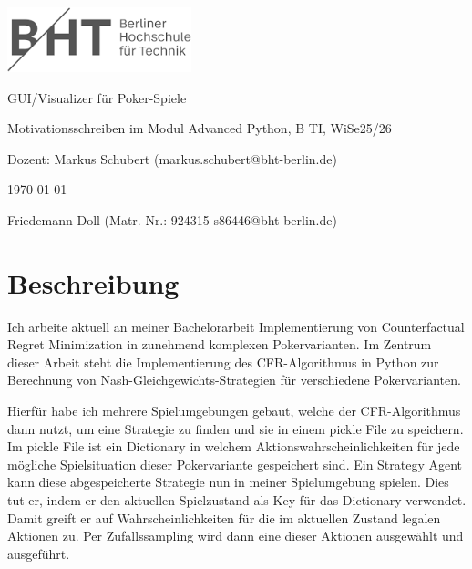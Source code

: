 \documentclass[12pt,german,english]{article}
\begin{document}
\begin{center}

    \includegraphics[width=0.4\textwidth]{bht-logo.png}

    \vspace{1.5cm}

    {\huge GUI/Visualizer für Poker-Spiele}

    \vspace*{1cm}

    Motivationsschreiben im Modul Advanced Python, B TI, WiSe25/26

    \vspace{0.5cm}

    Dozent: Markus Schubert (markus.schubert@bht-berlin.de)

    \vspace{0.5cm}

    \todayfmtde\today

    \vspace{1cm}

    Friedemann Doll (Matr.-Nr.: 924315 s86446@bht-berlin.de)

\end{center}

\vspace*{1cm}

\section{Beschreibung}
Ich arbeite aktuell an meiner Bachelorarbeit \glqq Implementierung von Counterfactual Regret Minimization in zunehmend komplexen Pokervarianten\grqq.
Im Zentrum dieser Arbeit steht die Implementierung des CFR-Algorithmus in Python zur Berechnung von Nash-Gleichgewichts-Strategien für verschiedene Pokervarianten. 


Hierfür habe ich mehrere Spielumgebungen gebaut, welche der CFR-Algorithmus dann nutzt, um eine Strategie zu finden und sie in einem pickle File zu speichern.
Im pickle File ist ein Dictionary in welchem Aktionswahrscheinlichkeiten für jede mögliche Spielsituation dieser Pokervariante gespeichert sind.
Ein Strategy Agent kann diese abgespeicherte Strategie nun in meiner Spielumgebung spielen.
Dies tut er, indem er den aktuellen Spielzustand als Key für das Dictionary verwendet. Damit greift er auf Wahrscheinlichkeiten für die im aktuellen Zustand legalen Aktionen zu.
Per Zufallssampling wird dann eine dieser Aktionen ausgewählt und ausgeführt.
\end{document}
